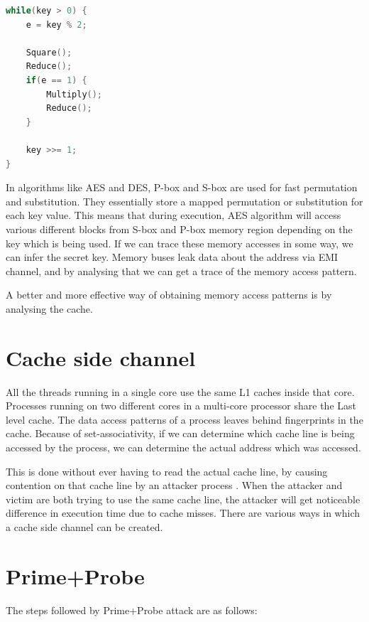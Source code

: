\begin{lstlisting}[caption={Key-dependent branch of fast exponentiation used in RSA},label={lst:kdrsa},language={C}]
while(key > 0) {
    e = key % 2;

    Square();
    Reduce();
    if(e == 1) {
        Multiply();
        Reduce();
    }

    key >>= 1;
}
\end{lstlisting}

In algorithms like AES and DES, P-box and S-box are used for fast permutation and substitution.
They essentially store a mapped permutation or substitution for each key value.
This means that during execution, AES algorithm will access various different blocks from
S-box and P-box memory region depending on the key which is being used. If we can
trace these memory accesses in some way, we can infer the secret key.
Memory buses leak data about the address via EMI channel, and by analysing that we can
get a trace of the memory access pattern.

A better and more effective way of obtaining memory access patterns is by analysing the cache.

\section{Cache side channel}

All the threads running in a single core use the same L1 caches inside that core.
Processes running on two different cores in a multi-core processor share the Last level cache.
The data access patterns of a process leaves behind fingerprints in the cache. Because of set-associativity,
if we can determine which cache line is being accessed by the process, we can determine the actual address
which was accessed.

This is done without ever having to read the actual cache line, by causing contention
on that cache line by an attacker process . When the attacker and victim are both trying to use the same cache
line, the attacker will get noticeable difference in execution time due to cache misses.
There are various ways in which a cache side channel can be created.

\section{Prime+Probe}

The steps followed by Prime+Probe attack are as follows:

